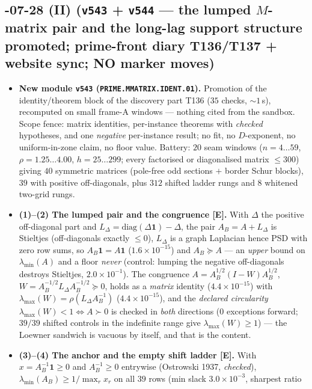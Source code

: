 \documentclass[11pt]{article}
\providecommand{\mE}{\textbf{[E]}}\providecommand{\mC}{\textbf{[C]}}
\begin{document}
\subsection*{-07-28 (II) (\texttt{v543} + \texttt{v544} --- the lumped $M$-matrix pair and the long-lag support structure promoted; prime-front diary T136/T137 + website sync; NO marker moves)}
\begin{itemize}[leftmargin=1.5em]
\item \textbf{New module \texttt{v543} (\texttt{PRIME.MMATRIX.IDENT.01}).} Promotion of the
identity/theorem block of the discovery part T136 ($35$ checks, ${\sim}1$\,s), recomputed on small
frame-A windows --- nothing cited from the sandbox. Scope fence: matrix identities, per-instance
theorems with \emph{checked} hypotheses, and one \emph{negative} per-instance result; no fit, no
$D$-exponent, no uniform-in-zone claim, no floor value. Battery: $20$ seam windows
($n=4\ldots59$, $\rho=1.25\ldots4.00$, $h=25\ldots299$; every factorised or diagonalised matrix
$\le300$) giving $40$ symmetric matrices (pole-free odd sections $+$ border Schur blocks), $39$ with
positive off-diagonals, plus $312$ shifted ladder rungs and $8$ whitened two-grid rungs.
\item \textbf{(1)--(2) The lumped pair and the congruence \mE.} With $\Delta$ the positive
off-diagonal part and $L_\Delta=\mathrm{diag}(\Delta\mathbf 1)-\Delta$, the pair
$A_B=A+L_\Delta$ is Stieltjes (off-diagonals exactly $\le0$), $L_\Delta$ is a graph Laplacian hence
PSD with zero row sums, so $A_B\mathbf 1=A\mathbf 1$ ($1.6\times10^{-15}$) and $A_B\succeq A$ ---
an \emph{upper} bound on $\lambda_{\min}(A)$ and a floor \emph{never} (control: lumping the negative
off-diagonals destroys Stieltjes, $2.0\times10^{-1}$). The congruence
$A=A_B^{1/2}(I-W)A_B^{1/2}$, $W=A_B^{-1/2}L_\Delta A_B^{-1/2}\succeq0$, holds as a \emph{matrix}
identity ($4.4\times10^{-15}$) with $\lambda_{\max}(W)=\rho(L_\Delta A_B^{-1})$
($4.4\times10^{-15}$), and the \emph{declared circularity} $\lambda_{\max}(W)<1\iff A\succ0$ is
checked in \emph{both} directions ($0$ exceptions forward; $39/39$ shifted controls in the
indefinite range give $\lambda_{\max}(W)\ge1$) --- the Loewner sandwich is vacuous by itself, and
that is the content.
\item \textbf{(3)--(4) The anchor and the empty shift ladder \mE.} With $x=A_B^{-1}\mathbf 1\ge0$
and $A_B^{-1}\ge0$ entrywise (Ostrowski 1937, \emph{checked}),
$\lambda_{\min}(A_B)\ge1/\max_r x_r$ on all $39$ rows (min slack $3.0\times10^{-3}$, sharpest ratio

\end{itemize}
\end{document}
